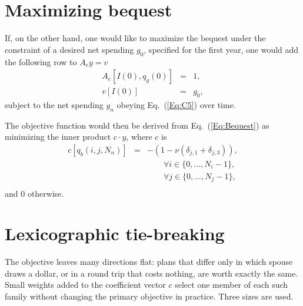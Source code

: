 \documentclass[fleqn,12pt]{report}
\begin{document}
\section{Maximizing bequest}
\label{sec:bequest-objective}
If, on the other hand, one would like to maximize the bequest under the constraint of a desired
net spending $g_0$, specified for the first year,
one would add the following row to $A_ey = v$
\begin{eqnarray}
	\label{Eq:FixedIncome}
	A_e[I(0), q_g(0)] &=& 1, \nonumber \\
	v[I(0)] &=& g_0,
\end{eqnarray}
subject to the net spending $g_n$ obeying Eq.~(\ref{Eq:C5}) over time.

The objective function would then be derived from Eq.~(\ref{Eq:Bequest}) as
minimizing the inner product $c\cdot y$, where $c$ is
\begin{eqnarray}
	\label{Eq:MaxBequest}
	c[q_b(i, j, N_n)] &=& -(1 - \nu(\delta_{j, 1} + \delta_{j, 3})),\\
	&&\qquad\forall i \in \{0,\ldots, N_i-1\},\nonumber\\
	&&\qquad\forall j \in \{0,\ldots, N_j-1\},\nonumber\\
\end{eqnarray}
and 0 otherwise.

\section{Lexicographic tie-breaking}
\label{sec:lexicographic}
The objective leaves many directions flat: plans that differ only in which spouse draws a
dollar, or in a round trip that costs nothing, are worth exactly the same.  Small weights
added to the coefficient vector $c$ select one member of each such family without changing
the primary objective in practice.  Three sizes are used.
\end{document}
